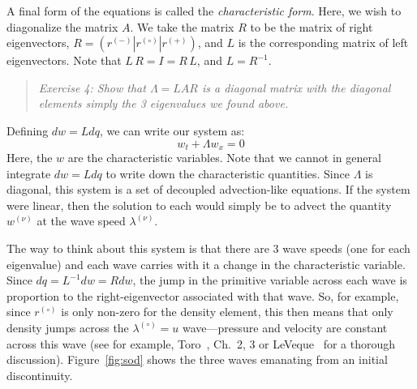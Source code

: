 \documentclass[11pt]{article}
\newcommand{\evm}{{(-)}}
\newcommand{\evz}{{(\circ)}}
\newcommand{\evp}{{(+)}}
\newcommand{\enu}{{(\nu)}}
\begin{document}
A final form of the equations is called the {\em characteristic form}.  Here,
we wish to diagonalize the matrix $A$.  We take the matrix $R$ to be the
matrix of right eigenvectors, $R = (r^\evm | r^\evz | r^\evp )$, and $L$
is the corresponding matrix of left eigenvectors.  Note that $L\, R = I = R\, L$, and
$L = R^{-1}$.
\begin{quote}
{\em Exercise 4: 
Show that $\Lambda = L A R$ is a diagonal matrix with the diagonal elements
simply the 3 eigenvalues we found above.
}
\end{quote}
Defining $dw = L dq$, we can write our system as:
\begin{equation}
w_t + \Lambda w_x = 0
\end{equation}
Here, the $w$ are the characteristic variables.  Note that we cannot
in general integrate $dw = L dq$ to write down the characteristic
quantities.  Since $\Lambda$ is diagonal, this system is a set of
decoupled advection-like equations.  If the system were linear, then the
solution to each would simply be to advect the quantity $w^\enu$ at
the wave speed $\lambda^\enu$.

The way to think about this system is that there are 3 wave speeds
(one for each eigenvalue) and each wave carries with it a change in
the characteristic variable.  Since $dq = L^{-1}dw = R dw$, the jump
in the primitive variable across each wave is proportion to the
right-eigenvector associated with that wave.  So, for example, since
$r^\evz$ is only non-zero for the density element, this then means
that only density jumps across the $\lambda^\evz = u$ wave---pressure
and velocity are constant across this wave (see for example,
Toro~\cite{toro:1997}, Ch.\ 2, 3 or LeVeque~\cite{leveque:2002} for a
thorough discussion).  Figure~\ref{fig:sod} shows the three waves
emanating from an initial discontinuity.
\end{document}
